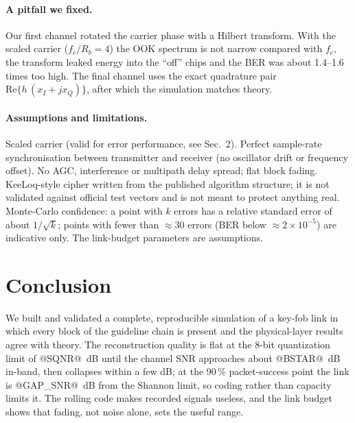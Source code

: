 \documentclass[11pt,a4paper]{article}
\begin{document}
\paragraph{A pitfall we fixed.} Our first channel rotated the carrier phase with a Hilbert transform. With the scaled carrier ($f_c/R_b=4$) the OOK spectrum is not narrow compared with $f_c$, the transform leaked energy into the ``off'' chips and the BER was about 1.4--1.6 times too high.
The final channel uses the exact quadrature pair $\mathrm{Re}\{h\,(x_I+jx_Q)\}$, after which the simulation matches theory.

\paragraph{Assumptions and limitations.}
Scaled carrier (valid for error performance, see Sec.~2). Perfect sample-rate synchronisation between transmitter and receiver (no oscillator drift or frequency offset). No AGC, interference or multipath delay spread; flat block fading. KeeLoq-style cipher written from the published algorithm structure; it is not validated against official test vectors and is not meant to protect anything real.
Monte-Carlo confidence: a point with $k$ errors has a relative standard error of about $1/\sqrt{k}$; points with fewer than $\approx$30 errors (BER below $\approx2\times10^{-5}$) are indicative only. The link-budget parameters are assumptions.

\section{Conclusion}
We built and validated a complete, reproducible simulation of a key-fob link in which every block of the guideline chain is present and the physical-layer results agree with theory.
The reconstruction quality is flat at the 8-bit quantization limit of @SQNR@~dB until the channel SNR approaches about @BSTAR@~dB in-band, then collapses within a few dB; at the 90\,\% packet-success point the link is @GAP_SNR@~dB from the Shannon limit, so coding rather than capacity limits it. The rolling code makes recorded signals useless, and the link budget shows that fading, not noise alone, sets the useful range.
\end{document}
